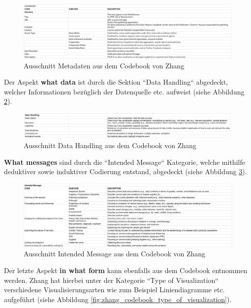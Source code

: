  \begin{figure}[ht]
    \includegraphics[width=12cm]{images/zhang_codebook_metadata.png}
    \centering
    \caption{Ausschnitt Metadaten aus dem Codebook von Zhang ~\citep{zhang_codebook}}
    \label{fig:zhang_codebook_metadata}
\end{figure}

Der Aspekt \textbf{what data} ist durch die Sektion ``Data Handling`` abgedeckt, welcher Informationen bezüglich der Datenquelle etc. aufweist (siehe Abbildung \ref{fig:zhang_codebook_data_handling}).

\begin{figure}[ht]
    \includegraphics[width=12cm]{images/zhang_codebook_data_handling.png}
    \centering
    \caption{Ausschnitt Data Handling aus dem Codebook von Zhang ~\citep{zhang_codebook}}
    \label{fig:zhang_codebook_data_handling}
\end{figure}

 \textbf{What messages} sind durch die ``Intended Message`` Kategorie, welche mithilfe deduktiver sowie induktiver Codierung entstand, abgedeckt (siehe Abbildung \ref{fig:zhang_codebook_intended_message}).

\begin{figure}[ht]
    \includegraphics[width=12cm]{images/zhang_codebook_intended_message.png}
    \centering
    \caption{Ausschnitt Intended Message aus dem Codebook von Zhang ~\citep{zhang_codebook}}
    \label{fig:zhang_codebook_intended_message}
\end{figure}

 Der letzte Aspekt \textbf{in what form} kann ebenfalls aus dem Codebook entnommen werden. Zhang hat hierbei unter der Kategorie ``Type of Visualization`` verschiedene Visualisierungsarten wie zum Beispiel Liniendiagramme etc. aufgeführt (siehe Abbildung \ref{fig:zhang_codebook_type_of_visualization}).
 

